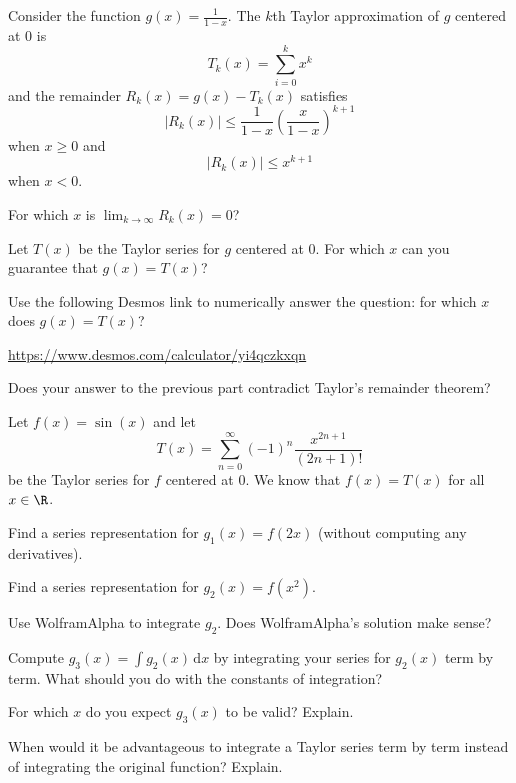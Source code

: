 \documentclass{workbook}
\begin{document}
\begin{slide}
	\question
	Consider the function $g(x)=\frac{1}{1-x}$. The $k$th Taylor approximation
	of $g$ centered at $0$ is 
	\[
	T_k(x)=\sum_{i=0}^k x^k
	\]
	and the remainder $R_k(x)=g(x)-T_k(x)$ satisfies 
	\[
		|R_k(x)| \leq \frac{1}{1-x}\left(\frac{x}{1-x}\right)^{k+1}
	\]
	when $x\geq 0$ and
	\[
		|R_k(x)| \leq x^{k+1}
	\]
	when $x< 0$.

	\bigskip
	\bigskip
	\bigskip
	\begin{parts}
		\item For which $x$ is $\lim_{k\to\infty}R_k(x)=0$?

		\item Let $T(x)$ be the Taylor series for $g$ centered at $0$.
		For which $x$ can you guarantee that $g(x)=T(x)$?

		\item Use the following Desmos link to numerically answer the question: for which $x$ does $g(x)=T(x)$?

		{\small\url{https://www.desmos.com/calculator/yi4qczkxqn}}

		\item Does your answer to the previous part contradict Taylor's remainder theorem?

	\end{parts}
\end{slide}

\begin{slide}
	\question
	Let $f(x)=\sin(x)$ and let 
	\[
		T(x)=\sum_{n=0}^\infty (-1)^{n}\frac{x^{2n+1}}{(2n+1)!}
	\]
	be the Taylor series for $f$ centered at $0$. We know that
	$f(x)=T(x)$ for all $x\in \R$.

	\begin{parts}
		\item Find a series representation for $g_1(x)=f(2x)$ (without 
		computing any derivatives).
		\item Find a series representation for $g_2(x)=f(x^2)$.
		\item Use WolframAlpha to integrate $g_2$. Does WolframAlpha's solution make sense?
		\item Compute $g_3(x)=\displaystyle \int g_2(x)\,\mathrm d x$ by integrating your series for $g_2(x)$ term by term. What should you do with the constants of integration?
		\item For which $x$ do you expect $g_3(x)$ to be valid? Explain.
		\item When would it be advantageous to integrate a Taylor series term by term instead of integrating the original function? Explain.
	\end{parts}
\end{slide}
\end{document}
